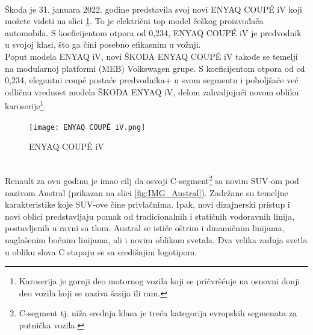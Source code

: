 \documentclass[a4paper]{article}
\begin{document}
\\

    Škoda je 31. januara 2022. godine predstavila svoj novi ENYAQ COUPÉ iV koji možete videti na slici \ref{fig:IMG_Enyaq}. To je električni top model češkog proizvođača automobila. S koeficijentom otpora od 0,234, ENYAQ COUPÉ iV je predvodnik u svojoj klasi, što ga čini posebno efikasnim u vožnji. \\
    Poput modela ENYAQ iV, novi ŠKODA ENYAQ COUPÉ iV takođe se temelji na modularnoj platformi (MEB) Volkswagen grupe. S koeficijentom otpora od cd 0,234, elegantni coupé postaće predvodnika+ u svom segmentu i poboljšaće već odličnu vrednost modela ŠKODA ENYAQ iV, delom zahvaljujući novom obliku karoserije\footnote{Karoserija je gornji deo motornog vozila koji se pričvršćuje na osnovni donji deo vozila koji se naziva šasija ili ram.}.\\ 

\begin{figure}[h]
        \centering
        \texttt{[image: ENYAQ COUPÉ iV.png]}
        \caption{ENYAQ COUPÉ iV}
        \label{fig:IMG_Enyaq}
\end{figure}


\\

    Renault za ovu godinu je imao cilj da osvoji C-segment\footnote{C-segment tj. niža srednja klasa je treća kategorija evropskih segmenata za putnička vozila.} sa novim SUV-om pod nazivom Austral (prikazan na slici \ref{fig:IMG_Austral}). Zadržane su temeljne karakteristike koje SUV-ove čine privlačnima. Ipak, novi dizajnerski pristup i novi oblici predstavljaju pomak od tradicionalnih i statičnih vodoravnih linija, postavljenih u ravni sa tlom. Austral se ističe oštrim i dinamičnim linijama, naglašenim bočnim linijama, ali i novim oblikom svetala. Dva velika zadnja svetla u obliku slova C stapaju se sa središnjim logotipom.\\  

    \newpage
\end{document}
